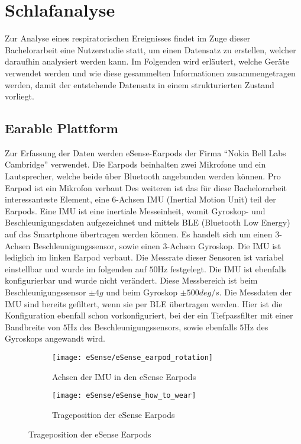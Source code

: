 
\chapter{Schlafanalyse}
\label{ch:sa}
Zur Analyse eines respiratorischen Ereignisses findet im Zuge dieser Bachelorarbeit eine Nutzerstudie statt, um einen Datensatz zu erstellen, welcher daraufhin analysiert werden kann. Im Folgenden wird erläutert, welche Geräte verwendet werden und wie diese gesammelten Informationen zusammengetragen werden, damit der entstehende Datensatz in einem strukturierten Zustand vorliegt.

\section{Earable Plattform}
\label{ch:sa:ep}
Zur Erfassung der Daten werden eSense-Earpods der Firma ``Nokia Bell Labs Cambridge'' verwendet.	
Die Earpods beinhalten zwei Mikrofone und ein Lautsprecher, welche beide über Bluetooth angebunden werden können.
Pro Earpod ist ein Mikrofon verbaut
Des weiteren ist das für diese Bachelorarbeit interessanteste Element, eine 6-Achsen IMU (Inertial Motion Unit) teil der Earpods.
Eine IMU ist eine inertiale Messeinheit, womit Gyroskop- und Beschleunigungsdaten aufgezeichnet und mittels BLE (Bluetooth Low Energy) auf das Smartphone übertragen werden können. 
Es handelt sich um einen 3-Achsen Beschleunigungssensor, sowie einen 3-Achsen Gyroskop.
Die IMU ist lediglich im linken Earpod verbaut.
Die Messrate dieser Sensoren ist variabel einstellbar und wurde im folgenden auf $50 \si{\hertz}$ festgelegt.
Die IMU ist ebenfalls konfigurierbar und wurde nicht verändert. Diese Messbereich ist beim Beschleunigungssensor $\pm 4g$ und beim Gyroskop $\pm 500deg/s$.
Die Messdaten der IMU sind bereits gefiltert, wenn sie per BLE übertragen werden.
Hier ist die Konfiguration ebenfall schon vorkonfiguriert, bei der ein Tiefpassfilter mit einer Bandbreite von $5\si{\hertz}$ des Beschleunigungssensors, sowie ebenfalls $5\si{\hertz}$ des Gyroskops angewandt wird.

\begin{figure}[ht]
    \centering
    \begin{subfigure}{.49\textwidth}
      \texttt{[image: eSense/eSense\_earpod\_rotation]}
      \caption{Achsen der IMU in den eSense Earpods}
      \label{analysis:eSense:rotation}
    \end{subfigure}
    \begin{subfigure}{.49\textwidth}
      \texttt{[image: eSense/eSense\_how\_to\_wear]}
      \caption{Trageposition der eSense Earpods}
      \label{analysis:eSense:how_to_wear}
    \end{subfigure}
    \label{analysis:eSense:images}
  \end{figure}

